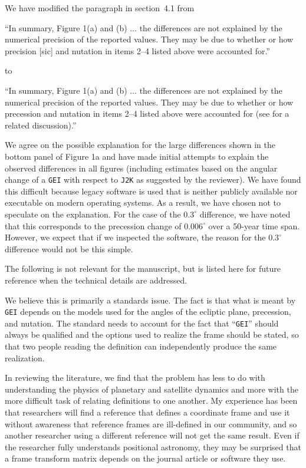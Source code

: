 \documentclass[11pt]{article}
\begin{document}
{\color{violet}
\begin{leftbar}
We have modified the paragraph in section~4.1 from

``In summary, Figure 1(a) and (b) ... the differences are not explained by the numerical precision of the reported values. They may be due to whether or how precision [sic] and nutation in items 2--4 listed above were accounted for.''

to

``In summary, Figure 1(a) and (b) ... the differences are not explained by the numerical precision of the reported values. They may be due to whether or how precession and nutation in items 2--4 listed above were accounted for (see \citet{Hapgood1995} for a related discussion).''

We agree on the possible explanation for the large differences shown in the bottom panel of Figure 1a and have made initial attempts to explain the observed differences in all figures (including estimates based on the angular change of a \texttt{GEI} with respect to \texttt{J2K} as suggested by the reviewer). We have found this difficult because legacy software is used that is neither publicly available nor executable on modern operating systems. As a result, we have chosen not to speculate on the explanation. For the case of the $0.3^\circ$ difference, we have noted that this corresponds to the precession change of $0.006^\circ$ over a 50-year time span. However, we expect that if we inspected the software, the reason for the $0.3^\circ$ difference would not be this simple.

The following is not relevant for the manuscript, but is listed here for future reference when the technical details are addressed.

We believe this is primarily a standards issue. The fact is that what is meant by \texttt{GEI} depends on the models used for the angles of the ecliptic plane, precession, and nutation. The standard needs to account for the fact that ``\texttt{GEI}'' should always be qualified and the options used to realize the frame should be stated, so that two people reading the definition can independently produce the same realization.

In reviewing the literature, we find that the problem has less to do with understanding the physics of planetary and satellite dynamics and more with the more difficult task of relating definitions to one another. My experience has been that researchers will find a reference that defines a coordinate frame and use it without awareness that reference frames are ill-defined in our community, and so another researcher using a different reference will not get the same result. Even if the researcher fully understands positional astronomy, they may be surprised that a frame transform matrix depends on the journal article or software they use.
\end{leftbar}
}
\end{document}
